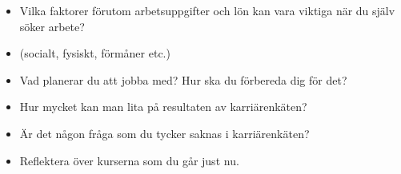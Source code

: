 \mode*

\begin{frame}
  \begin{question}
    \begin{itemize}
      \item Vilka faktorer förutom arbetsuppgifter och lön kan vara viktiga när 
        du själv söker arbete?
      \item (socialt, fysiskt, förmåner etc.)
    \end{itemize}
  \end{question}
\end{frame}

\begin{frame}
  \begin{question}
    \begin{itemize}
      \item Vad planerar du att jobba med? Hur ska du förbereda dig för det?
    \end{itemize}
  \end{question}
\end{frame}

\begin{frame}
  \begin{question}
    \begin{itemize}
      \item Hur mycket kan man lita på resultaten av karriärenkäten?
      \item Är det någon fråga som du tycker saknas i karriärenkäten?
    \end{itemize}
  \end{question}
\end{frame}

\begin{frame}
  \begin{question}
    \begin{itemize}
      \item Reflektera över kurserna som du går just nu.
    \end{itemize}
  \end{question}
\end{frame}


